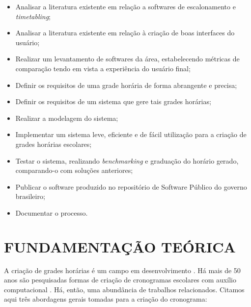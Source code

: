 \documentclass[12pt,a4paper]{article}
\begin{document}
			\begin{itemize}
				\item Analisar a literatura existente em relação a softwares de escalonamento e \textit{timetabling};
				\item Analisar a literatura existente em relação à criação de boas interfaces do usuário;
				\item Realizar um levantamento de softwares da área, estabelecendo métricas de comparação tendo em vista a experiência do usuário final;
				\item Definir os requisitos de uma grade horária de forma abrangente e precisa;
				\item Definir os requisitos de um sistema que gere tais grades horárias;
				\item Realizar a modelagem do sistema;
				\item Implementar um sistema leve, eficiente e de fácil utilização para a criação de grades horárias escolares;
				\item Testar o sistema, realizando \textit{benchmarking} e graduação do horário gerado, com\-pa\-ran\-do-o com soluções anteriores;
				\item Publicar o software produzido no repositório de Software Público do governo brasileiro;
				\item Documentar o processo.
			\end{itemize}

	\newpage


	\section{FUNDAMENTAÇÃO TEÓRICA}

		\par A criação de grades horárias é um campo em desenvolvimento \cite{patat2020}. Há mais de 50 anos são pesquisadas formas de criação de cronogramas escolares com auxílio computacional \cite{appleby}. Há, então, uma abundância de trabalhos relacionados. Citamos aqui três abordagens gerais tomadas para a criação do cronograma:
\end{document}
